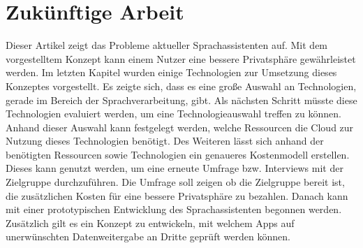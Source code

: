 \section{Zukünftige Arbeit}
Dieser Artikel zeigt das Probleme aktueller Sprachassistenten auf. Mit dem vorgestelltem Konzept kann einem Nutzer eine bessere Privatsphäre gewährleistet werden. Im letzten Kapitel wurden einige Technologien zur Umsetzung dieses Konzeptes vorgestellt. Es zeigte sich, dass es eine große Auswahl an Technologien, gerade im Bereich der Sprachverarbeitung, gibt. Als nächsten Schritt müsste diese Technologien evaluiert werden, um eine Technologieauswahl treffen zu können. Anhand dieser Auswahl kann festgelegt werden, welche Ressourcen die Cloud zur Nutzung dieses Technologien benötigt. Des Weiteren lässt sich anhand der benötigten Ressourcen sowie Technologien ein genaueres Kostenmodell erstellen. Dieses kann genutzt werden, um eine erneute Umfrage bzw. Interviews mit der Zielgruppe durchzuführen. Die Umfrage soll zeigen ob die Zielgruppe bereit ist, die zusätzlichen Kosten für eine bessere Privatsphäre zu bezahlen. Danach kann mit einer prototypischen Entwicklung des Sprachassistenten begonnen werden. Zusätzlich gilt es ein Konzept zu entwickeln, mit welchem Apps auf unerwünschten Datenweitergabe an Dritte geprüft werden können. 